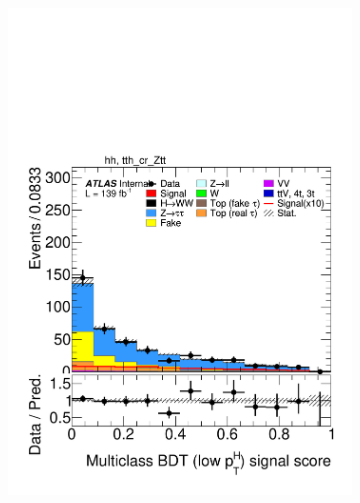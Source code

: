 \begin{figure}[h]
  \centering
  \begin{subfigure}[b]{0.32\textwidth}
    \includegraphics[width=\textwidth]{images/sr_cr_plots/plot_tth_signal_multiclass_lt200_hh_tth_cr_Ztt.pdf}
    \caption{}
  \end{subfigure}
  \begin{subfigure}[b]{0.32\textwidth}

\end{subfigure}
\end{figure}
